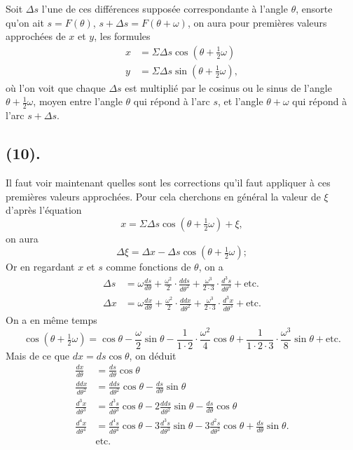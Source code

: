\documentclass{article}
\begin{document}
Soit $\Delta s$ l'une de ces différences supposée correspondante à l'angle $\theta$, ensorte qu'on ait $s=F(\theta)$, $s+\Delta s=F(\theta+\omega)$, on aura pour premières valeurs approchées de $x$ et $y$, les formules
\[ \begin{aligned} x&=\Sigma\Delta s\cos(\theta+\tfrac{1}{2}\omega)\\ y&=\Sigma\Delta s\sin(\theta+\tfrac{1}{2}\omega), \end{aligned} \]
où l'on voit que chaque $\Delta s$ est multiplié par le cosinus ou le sinus de l'angle $\theta+\frac{1}{2}\omega$, moyen entre l'angle $\theta$ qui répond à l'arc $s$, et l'angle $\theta+\omega$ qui répond à l'arc $s+\Delta s$.

\subsection*{(10).}

Il faut voir maintenant quelles sont les corrections qu'il faut appliquer à ces premières valeurs approchées. Pour cela cherchons en général la valeur de $\xi$ d'après l'équation
\[ x=\Sigma\Delta s\cos(\theta+\tfrac{1}{2}\omega)+\xi, \]
on aura
\[ \Delta\xi=\Delta x-\Delta s\cos(\theta+\tfrac{1}{2}\omega); \]
Or en regardant $x$ et $s$ comme fonctions de $\theta$, on a
\[ \begin{aligned} \Delta s&=\omega\frac{ds}{d\theta}+\frac{\omega^{2}}{2}\cdot\frac{dds}{d\theta^{2}}+\frac{\omega^{3}}{2\cdot3}\cdot\frac{d^{3}s}{d\theta^{3}}+\text{etc.}\\ \Delta x&=\omega\frac{dx}{d\theta}+\frac{\omega^{2}}{2}\cdot\frac{ddx}{d\theta^{2}}+\frac{\omega^{3}}{2\cdot3}\cdot\frac{d^{3}x}{d\theta^{3}}+\text{etc.} \end{aligned} \]
On a en même temps
\[ \cos(\theta+\tfrac{1}{2}\omega)=\cos\theta-\frac{\omega}{2}\sin\theta-\frac{1}{1\cdot2}\cdot\frac{\omega^{2}}{4}\cos\theta+\frac{1}{1\cdot2\cdot3}\cdot\frac{\omega^{3}}{8}\sin\theta+\text{etc.} \]
Mais de ce que $dx=ds\cos\theta$, on déduit
\[ \begin{aligned} \frac{dx}{d\theta}&=\frac{ds}{d\theta}\cos\theta\\ \frac{ddx}{d\theta^{2}}&=\frac{dds}{d\theta^{2}}\cos\theta-\frac{ds}{d\theta}\sin\theta\\ \frac{d^{3}x}{d\theta^{3}}&=\frac{d^{3}s}{d\theta^{3}}\cos\theta-2\frac{dds}{d\theta^{2}}\sin\theta-\frac{ds}{d\theta}\cos\theta\\ \frac{d^{4}x}{d\theta^{4}}&=\frac{d^{4}s}{d\theta^{4}}\cos\theta-3\frac{d^{3}s}{d\theta^{3}}\sin\theta-3\frac{d^{2}s}{d\theta^{2}}\cos\theta+\frac{ds}{d\theta}\sin\theta.\\ &\text{etc.} \end{aligned} \]
\end{document}
